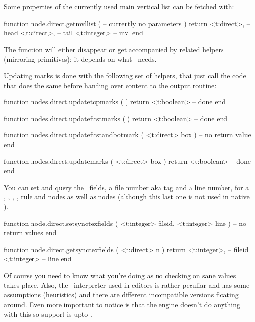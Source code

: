 \startsubsection[title={MVL}]

Some properties of the currently used main vertical list can be fetched with:

\starttyping[option=LUA]
function node.direct.getmvllist (
    -- currently no parameters
)
    return
        <t:direct>,  -- head
        <t:direct>,  -- tail
        <t:integer> -- mvl
end
\stoptyping

\stopsubsection

\startsubsection[title={Balancing}]

The  function will either disappear or get accompanied
by related helpers (mirroring primitives); it depends on what \CONTEXT\ needs.

Updating marks is done with the following set of helpers, that just call the code
that does the same before handing over content to the output routine:

\starttyping[option=LUA]
function nodes.direct.updatetopmarks ( )
    return <t:boolean> -- done
end

function nodes.direct.updatefirstmarks ( )
    return <t:boolean> -- done
end

function nodes.direct.updatefirstandbotmark ( <t:direct> box )
    -- no return value
end

function nodes.direct.updatemarks ( <t:direct> box )
    return <t:boolean> -- done
end
\stoptyping

\stopsubsection

\startsubsection[title={\SYNCTEX}]

You can set and query the \SYNCTEX\ fields, a file number aka tag and a line
number, for a , , , , \type
{rule} and  nodes as well as  nodes (although this last
one is not used in native \SYNCTEX).

\starttyping[option=LUA]
function node.direct.setsynctexfields ( <t:integer> fileid, <t:integer> line )
    -- no return values
end

function node.direct.getsynctexfields ( <t:direct> n )
    return
        <t:integer>, -- fileid
        <t:integer>  -- line
end
\stoptyping

Of course you need to know what you're doing as no checking on sane values takes
place. Also, the \SYNCTEX\ interpreter used in editors is rather peculiar and has
some assumptions (heuristics) and there are different incompatible versions
floating around. Even more important to notice is that the engine doesn't do
anything with this so support is upto \LUA.

